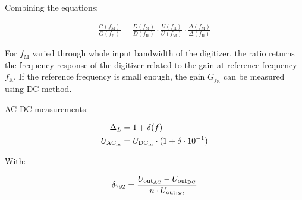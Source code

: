 \documentclass{article}
\begin{document}
%
%
Combining the equations:

\begin{align}
	\frac{G(f_\text{M})}{G(f_\text{R})} = \frac{D(f_\text{M})}{D(f_\text{R})} \cdot \frac{U(f_\text{R})}{U(f_\text{M})} \cdot \frac{\Delta(f_\text{M})}{\Delta(f_\text{R})}
\end{align}


For $f_\text{M}$ varied through whole input bandwidth of the digitizer, the
ratio returns the frequency response of the digitizer related to the gain at
reference frequency $f_\text{R}$. If the reference frequency is small enough,
the gain $G_{f_\text{R}}$ can be measured using DC method.

\textcolor{red}{}

AC-DC measurements:

\begin{align}
	\Delta_L        & = 1 + \delta(f)                                    \\
	U_{\rm AC_{in}} & = U_{\rm DC_{in}} \cdot (1 + \delta \cdot 10^{-1})
\end{align}

With:

\begin{align}
	\delta_{792} = \frac{U_{\rm out_{AC}} - U_{\rm out_{DC}}}{n\cdot U_{\rm out_{DC}}}
\end{align}
\end{document}
